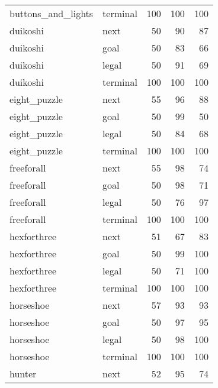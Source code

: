 \documentclass[a4paper,12pt]{report}
\begin{document}
\begin{tabular}{llrrr}
 buttons\_and\_lights & terminal    &       100 &     100 &                 100 \\
 duikoshi           & next        &        50 &      90 &                  87 \\
 duikoshi           & goal        &        50 &      83 &                  66 \\
 duikoshi           & legal       &        50 &      91 &                  69 \\
 duikoshi           & terminal    &       100 &     100 &                 100 \\
 eight\_puzzle       & next        &        55 &      96 &                  88 \\
 eight\_puzzle       & goal        &        50 &      99 &                  50 \\
 eight\_puzzle       & legal       &        50 &      84 &                  68 \\
 eight\_puzzle       & terminal    &       100 &     100 &                 100 \\
 freeforall         & next        &        55 &      98 &                  74 \\
 freeforall         & goal        &        50 &      98 &                  71 \\
 freeforall         & legal       &        50 &      76 &                  97 \\
 freeforall         & terminal    &       100 &     100 &                 100 \\
 hexforthree        & next        &        51 &      67 &                  83 \\
 hexforthree        & goal        &        50 &      99 &                 100 \\
 hexforthree        & legal       &        50 &      71 &                 100 \\
 hexforthree        & terminal    &       100 &     100 &                 100 \\
 horseshoe          & next        &        57 &      93 &                  93 \\
 horseshoe          & goal        &        50 &      97 &                  95 \\
 horseshoe          & legal       &        50 &      98 &                 100 \\
 horseshoe          & terminal    &       100 &     100 &                 100 \\
 hunter             & next        &        52 &      95 &                  74 \\

\end{tabular}
\end{document}
